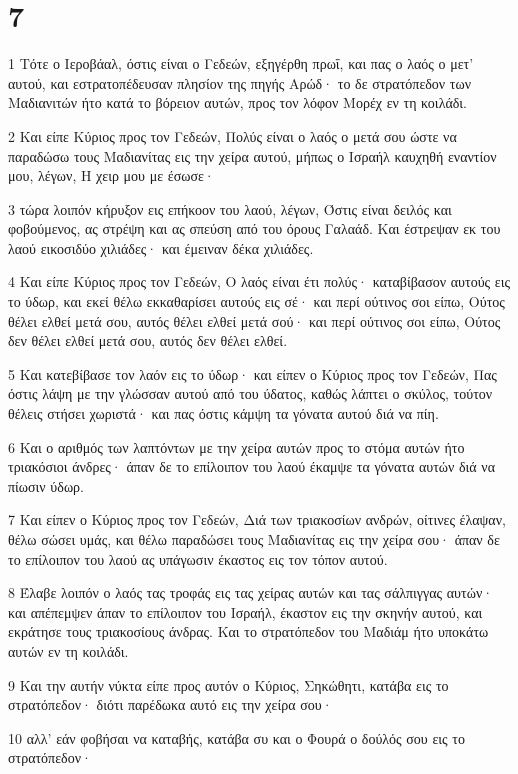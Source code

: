 \chapter{7}

\par 1 Τότε ο Ιεροβάαλ, όστις είναι ο Γεδεών, εξηγέρθη πρωΐ, και πας ο λαός ο μετ' αυτού, και εστρατοπέδευσαν πλησίον της πηγής Αρώδ· το δε στρατόπεδον των Μαδιανιτών ήτο κατά το βόρειον αυτών, προς τον λόφον Μορέχ εν τη κοιλάδι.
\par 2 Και είπε Κύριος προς τον Γεδεών, Πολύς είναι ο λαός ο μετά σου ώστε να παραδώσω τους Μαδιανίτας εις την χείρα αυτού, μήπως ο Ισραήλ καυχηθή εναντίον μου, λέγων, Η χειρ μου με έσωσε·
\par 3 τώρα λοιπόν κήρυξον εις επήκοον του λαού, λέγων, Όστις είναι δειλός και φοβούμενος, ας στρέψη και ας σπεύση από του όρους Γαλαάδ. Και έστρεψαν εκ του λαού εικοσιδύο χιλιάδες· και έμειναν δέκα χιλιάδες.
\par 4 Και είπε Κύριος προς τον Γεδεών, Ο λαός είναι έτι πολύς· καταβίβασον αυτούς εις το ύδωρ, και εκεί θέλω εκκαθαρίσει αυτούς εις σέ· και περί ούτινος σοι είπω, Ούτος θέλει ελθεί μετά σου, αυτός θέλει ελθεί μετά σού· και περί ούτινος σοι είπω, Ούτος δεν θέλει ελθεί μετά σου, αυτός δεν θέλει ελθεί.
\par 5 Και κατεβίβασε τον λαόν εις το ύδωρ· και είπεν ο Κύριος προς τον Γεδεών, Πας όστις λάψη με την γλώσσαν αυτού από του ύδατος, καθώς λάπτει ο σκύλος, τούτον θέλεις στήσει χωριστά· και πας όστις κάμψη τα γόνατα αυτού διά να πίη.
\par 6 Και ο αριθμός των λαπτόντων με την χείρα αυτών προς το στόμα αυτών ήτο τριακόσιοι άνδρες· άπαν δε το επίλοιπον του λαού έκαμψε τα γόνατα αυτών διά να πίωσιν ύδωρ.
\par 7 Και είπεν ο Κύριος προς τον Γεδεών, Διά των τριακοσίων ανδρών, οίτινες έλαψαν, θέλω σώσει υμάς, και θέλω παραδώσει τους Μαδιανίτας εις την χείρα σου· άπαν δε το επίλοιπον του λαού ας υπάγωσιν έκαστος εις τον τόπον αυτού.
\par 8 Έλαβε λοιπόν ο λαός τας τροφάς εις τας χείρας αυτών και τας σάλπιγγας αυτών· και απέπεμψεν άπαν το επίλοιπον του Ισραήλ, έκαστον εις την σκηνήν αυτού, και εκράτησε τους τριακοσίους άνδρας. Και το στρατόπεδον του Μαδιάμ ήτο υποκάτω αυτών εν τη κοιλάδι.
\par 9 Και την αυτήν νύκτα είπε προς αυτόν ο Κύριος, Σηκώθητι, κατάβα εις το στρατόπεδον· διότι παρέδωκα αυτό εις την χείρα σου·
\par 10 αλλ' εάν φοβήσαι να καταβής, κατάβα συ και ο Φουρά ο δούλός σου εις το στρατόπεδον·
